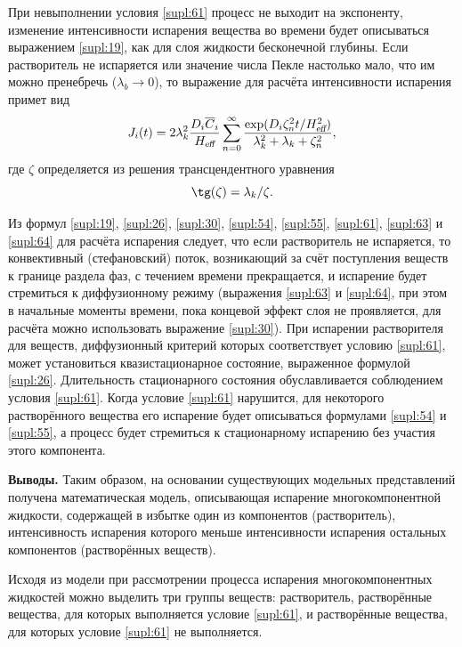 При невыполнении условия \eqref{supl:61} процесс не выходит на экспоненту, изменение интенсивности испарения вещества во времени будет описываться выражением \eqref{supl:19}, как для слоя жидкости бесконечной глубины.
Если растворитель не испаряется или значение числа Пекле настолько мало, что им можно пренебречь ($\lambda_b \to 0$), то выражение для расчёта интенсивности испарения примет вид
\begin{equation}
J_i(t)=2\lambda_k^2 \frac{D_i \overline{C}_i}{H_\text{\slshape eff}} \sum \limits_{n=0}^\infty
\frac{\exp (D_i\zeta_n^2t/H_\text{\slshape eff}^2)}{\lambda_k^2+\lambda_k+\zeta_n^2},
\label{supl:63}
\end{equation}
где $\zeta$ определяется из решения трансцендентного уравнения
\begin{equation}
\tg (\zeta) = \lambda_k/\zeta.
\label{supl:64}
\end{equation}

Из  формул \eqref{supl:19}, \eqref{supl:26}, \eqref{supl:30}, \eqref{supl:54}, \eqref{supl:55}, \eqref{supl:61}, \eqref{supl:63} и \eqref{supl:64} для расчёта испарения  следует, что если растворитель не испаряется, то конвективный (стефановский) поток, возникающий за счёт поступления веществ к границе раздела фаз, с течением времени прекращается, и испарение будет стремиться к диффузионному режиму (выражения \eqref{supl:63} и \eqref{supl:64}, при этом в начальные моменты времени, пока концевой эффект слоя не проявляется, для расчёта можно использовать выражение \eqref{supl:30}).
При испарении растворителя для веществ, диффузионный критерий которых соответствует условию \eqref{supl:61}, может установиться квазистационарное состояние, выраженное формулой \eqref{supl:26}. Длительность стационарного состояния обуславливается соблюдением условия \eqref{supl:61}. Когда условие \eqref{supl:61} нарушится, для некоторого растворённого вещества его испарение будет описываться формулами \eqref{supl:54} и \eqref{supl:55}, а процесс будет стремиться к стационарному испарению без участия этого компонента.

\smallskip

\textbf{Выводы.}
Таким образом, на основании существующих модельных представлений получена математическая модель, описывающая испарение многокомпонентной жидкости, содержащей в избытке один из компонентов (растворитель), интенсивность испарения которого меньше интенсивности испарения остальных компонентов (растворённых веществ). 

Исходя из модели при рассмотрении процесса испарения многокомпонентных жидкостей можно выделить три группы веществ: растворитель, растворённые вещества, для которых выполняется условие \eqref{supl:61}, и растворённые вещества, для которых условие \eqref{supl:61} не выполняется.

